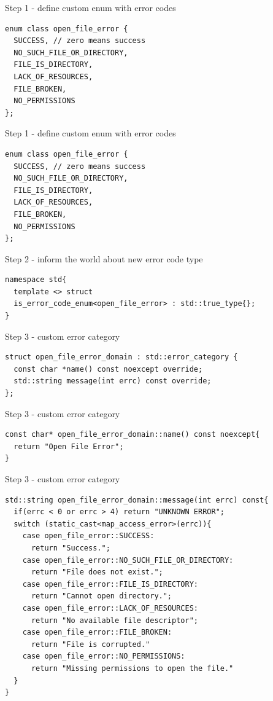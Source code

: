 \documentclass[10pt]{beamer}
\begin{document}
\begin{frame}[fragile]{Step 1 - define custom enum with error codes}
\begin{verbatim}
enum class open_file_error {
  SUCCESS, // zero means success
  NO_SUCH_FILE_OR_DIRECTORY,
  FILE_IS_DIRECTORY,
  LACK_OF_RESOURCES,
  FILE_BROKEN,
  NO_PERMISSIONS
};
\end{verbatim}
\end{frame}

\begin{frame}[fragile]{Step 1 - define custom enum with error codes}
\begin{verbatim}
enum class open_file_error {
  SUCCESS, // zero means success
  NO_SUCH_FILE_OR_DIRECTORY,
  FILE_IS_DIRECTORY,
  LACK_OF_RESOURCES,
  FILE_BROKEN,
  NO_PERMISSIONS
};
\end{verbatim}
\end{frame}

\begin{frame}[fragile]{Step 2 - inform the world about new error code type}
\begin{verbatim}
namespace std{
  template <> struct
  is_error_code_enum<open_file_error> : std::true_type{};
}
\end{verbatim}
	
\end{frame}

\begin{frame}[fragile]{Step 3 - custom error category}
	
	\begin{verbatim}
struct open_file_error_domain : std::error_category {
  const char *name() const noexcept override;		
  std::string message(int errc) const override;
};
	\end{verbatim}
\end{frame}

\begin{frame}[fragile]{Step 3 - custom error category}
\begin{verbatim}
const char* open_file_error_domain::name() const noexcept{
  return "Open File Error";
}
\end{verbatim}
\end{frame}

\begin{frame}[fragile]{Step 3 - custom error category}
	\begin{verbatim}
std::string open_file_error_domain::message(int errc) const{
  if(errc < 0 or errc > 4) return "UNKNOWN ERROR";
  switch (static_cast<map_access_error>(errc)){
    case open_file_error::SUCCESS:
      return "Success.";
    case open_file_error::NO_SUCH_FILE_OR_DIRECTORY:
      return "File does not exist.";
    case open_file_error::FILE_IS_DIRECTORY:
      return "Cannot open directory.";
    case open_file_error::LACK_OF_RESOURCES:
      return "No available file descriptor";
    case open_file_error::FILE_BROKEN:
      return "File is corrupted."
    case open_file_error::NO_PERMISSIONS:
      return "Missing permissions to open the file."
  }
}
	\end{verbatim}
\end{frame}
\end{document}
